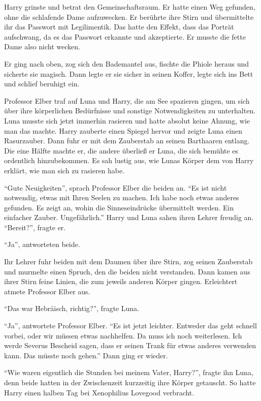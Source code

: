 Harry grinste und betrat den Gemeinschaftsraum. Er hatte einen Weg gefunden, ohne die schlafende Dame aufzuwecken. Er berührte ihre Stirn und übermittelte ihr das Passwort mit Legilimentik. Das hatte den Effekt, dass das Porträt aufschwang, da es das Passwort erkannte und akzeptierte. Er musste die fette Dame also nicht wecken.

Er ging nach oben, zog sich den Bademantel aus, fischte die Phiole heraus und sicherte sie magisch. Dann legte er sie sicher in seinen Koffer, legte sich ins Bett und schlief beruhigt ein.

\trenn

Professor Elber traf auf Luna und Harry, die am See spazieren gingen, um sich über ihre körperlichen Bedürfnisse und sonstige Notwendigkeiten zu unterhalten. Luna musste sich jetzt immerhin rasieren und hatte absolut keine Ahnung, wie man das machte. Harry zauberte einen Spiegel hervor und zeigte Luna einen Rasurzauber. Dann fuhr er mit dem Zauberstab an seinen Barthaaren entlang. Die eine Hälfte machte er, die andere überließ er Luna, die sich bemühte es ordentlich hinzubekommen. Es sah lustig aus, wie Lunas Körper dem von Harry erklärt, wie man sich zu rasieren habe.

\enquote{Gute Neuigkeiten}, sprach Professor Elber die beiden an. \enquote{Es ist nicht notwendig, etwas mit Ihren Seelen zu machen. Ich habe noch etwas anderes gefunden. Es zeigt an, wohin die Sinneseindrücke übermittelt werden. Ein einfacher Zauber. Ungefährlich.} Harry und Luna sahen ihren Lehrer freudig an. \enquote{Bereit?}, fragte er.

\enquote{Ja}, antworteten beide.

Ihr Lehrer fuhr beiden mit dem Daumen über ihre Stirn, zog seinen Zauberstab und murmelte einen Spruch, den die beiden nicht verstanden. Dann kamen aus ihrer Stirn feine Linien, die zum jeweils anderen Körper gingen. Erleichtert atmete Professor Elber aus.

\enquote{Das war Hebräisch, richtig?}, fragte Luna.

\enquote{Ja}, antwortete Professor Elber. \enquote{Es ist jetzt leichter. Entweder das geht schnell vorbei, oder wir müssen etwas nachhelfen. Da muss ich noch weiterlesen. Ich werde Severus Bescheid sagen, dass er seinen Trank für etwas anderes verwenden kann. Das müsste noch gehen.} Dann ging er wieder.

\enquote{Wie waren eigentlich die Stunden bei meinem Vater, Harry?}, fragte ihn Luna, denn beide hatten in der Zwischenzeit kurzzeitig ihre Körper getauscht. So hatte Harry einen halben Tag bei Xenophilius Lovegood verbracht.

